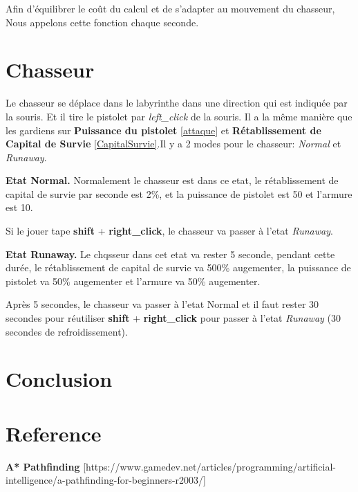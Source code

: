 \documentclass{article}
\begin{document}
Afin d'équilibrer le coût du calcul et de s'adapter au mouvement du chasseur, Nous appelons cette fonction chaque seconde.

\section{Chasseur}
Le chasseur se déplace dans le labyrinthe dans une direction qui est indiquée par la souris. Et il tire le pistolet par \textsl{left\_click} de la souris. Il a la même manière que les gardiens sur \textbf{Puissance du pistolet} \ref{attaque} et \textbf{Rétablissement de Capital de Survie} \ref{CapitalSurvie}.Il y a 2 modes pour le chasseur: \textsl{Normal} et \textsl{Runaway}.

\textbf{Etat Normal.} Normalement le chasseur est dans ce etat, le  rétablissement de capital de survie par seconde est 2\%, et la puissance de pistolet est 50 et l'armure est 10. 

Si le jouer tape \textbf{shift} + \textbf{right\_click}, le chasseur va passer à l'etat   \textsl{Runaway}.

\textbf{Etat Runaway.} Le chqsseur dans cet etat va rester 5 seconde, pendant cette durée,  le  rétablissement de capital de survie va 500\% augementer, la puissance de pistolet va 50\% augementer et l'armure va 50\% augementer.

Après 5 secondes, le chasseur va passer à l'etat Normal et il faut rester 30 secondes pour réutiliser \textbf{shift} + \textbf{right\_click} pour passer à l'etat \textsl{Runaway} (30 secondes de refroidissement).


\section{Conclusion}

\section{Reference}
\textbf{A* Pathfinding} [https://www.gamedev.net/articles/programming/artificial-intelligence/a-pathfinding-for-beginners-r2003/]

 
% 

\end{document}

